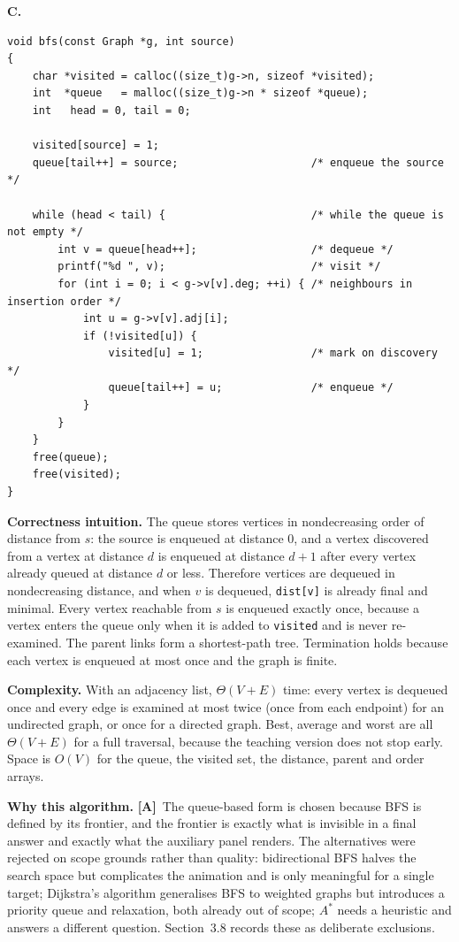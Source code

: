\documentclass[11pt,a4paper]{article}
\newcommand{\A}{\textcolor{asmc}{\textbf{[A]}}}     %
\newcommand{\ct}[1]{\texttt{#1}}
\begin{document}
\smallskip
\noindent\textbf{C.}
\begin{lstlisting}[style=c,caption={Breadth-first search in C. The queue is a plain array with head and tail indices, bounded by the vertex count.},label={lst:c-bfs}]
void bfs(const Graph *g, int source)
{
    char *visited = calloc((size_t)g->n, sizeof *visited);
    int  *queue   = malloc((size_t)g->n * sizeof *queue);
    int   head = 0, tail = 0;

    visited[source] = 1;
    queue[tail++] = source;                     /* enqueue the source */

    while (head < tail) {                       /* while the queue is not empty */
        int v = queue[head++];                  /* dequeue */
        printf("%d ", v);                       /* visit */
        for (int i = 0; i < g->v[v].deg; ++i) { /* neighbours in insertion order */
            int u = g->v[v].adj[i];
            if (!visited[u]) {
                visited[u] = 1;                 /* mark on discovery */
                queue[tail++] = u;              /* enqueue */
            }
        }
    }
    free(queue);
    free(visited);
}
\end{lstlisting}

\noindent\textbf{Correctness intuition.} The queue stores vertices in nondecreasing order of
distance from $s$: the source is enqueued at distance $0$, and a vertex discovered from a vertex
at distance $d$ is enqueued at distance $d+1$ after every vertex already queued at distance $d$
or less. Therefore vertices are dequeued in nondecreasing distance, and when $v$ is dequeued,
\ct{dist[v]} is already final and minimal. Every vertex reachable from $s$ is enqueued exactly
once, because a vertex enters the queue only when it is added to \ct{visited} and is never
re-examined. The parent links form a shortest-path tree. Termination holds because each vertex is
enqueued at most once and the graph is finite.

\smallskip
\noindent\textbf{Complexity.} With an adjacency list, $\Theta(V+E)$ time: every vertex is
dequeued once and every edge is examined at most twice (once from each endpoint) for an
undirected graph, or once for a directed graph. Best, average and worst are all
$\Theta(V+E)$ for a full traversal, because the teaching version does not stop early. Space is
$O(V)$ for the queue, the visited set, the distance, parent and order arrays.

\smallskip
\noindent\textbf{Why this algorithm.} \A\ The queue-based form is chosen because BFS is defined by
its frontier, and the frontier is exactly what is invisible in a final answer and exactly what the
auxiliary panel renders. The alternatives were rejected on scope grounds rather than quality:
bidirectional BFS halves the search space but complicates the animation and is only meaningful
for a single target; Dijkstra's algorithm generalises BFS to weighted graphs but introduces a
priority queue and relaxation, both already out of scope; $A^{*}$ needs a heuristic and answers a
different question. Section~3.8 records these as deliberate exclusions.
\end{document}
